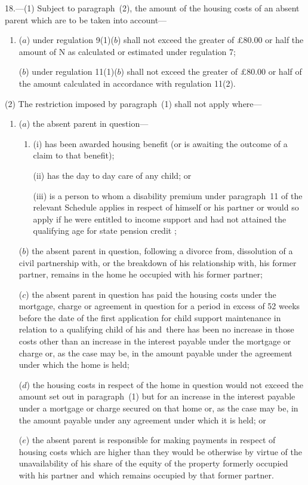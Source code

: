 \documentclass[12pt,a4paper]{article}
\begin{document}
18.—(1) Subject to paragraph~(2), the amount of the housing costs of an absent parent which are to be taken into account—
\begin{enumerate}\item[]
($a$) under regulation 9(1)($b$) shall not exceed the greater of £80$.$00 or half the amount of N as calculated or estimated under regulation 7;

($b$) under regulation 11(1)($b$) shall not exceed the greater of £80$.$00 or half of the amount calculated in accordance with regulation 11(2).
\end{enumerate}

(2) The restriction imposed by paragraph~(1) shall not apply where—
\begin{enumerate}\item[]
($a$) the absent parent in question—
\begin{enumerate}\item[]
(i) has been awarded housing benefit (or is awaiting the outcome of a claim to that benefit);

(ii) has the day to day care of any child; or

(iii) is a person to whom a disability premium under paragraph~11 of the relevant Schedule applies in respect of himself or his partner or would so apply if he were entitled to income support and 
had not attained the qualifying age for state pension credit%
;
\end{enumerate}

($b$) the absent parent in question, following a divorce from, 
dissolution of a civil partnership with,  %
or the breakdown of his relationship with, his former partner, remains in the home he occupied with his former partner;

($c$) the absent parent in question has paid the housing costs under the mortgage, charge or agreement in question for a period in excess of 52 weeks before the date of the first application for child support maintenance in relation to a qualifying child of his and~there has been no increase in those costs other than an increase in the interest payable under the mortgage or charge or, as the case may be, in the amount payable under the agreement under which the home is held;

($d$) the housing costs in respect of the home in question would not exceed the amount set out in paragraph~(1) but for an increase in the interest payable under a mortgage or charge secured on that home or, as the case may be, in the amount payable under any agreement under which it is held; or

($e$) the absent parent is responsible for making payments in respect of housing costs which are higher than they would be otherwise by virtue of the unavailability of his share of the equity of the property formerly occupied with his partner and~which remains occupied by that former partner.
\end{enumerate}
\end{document}
